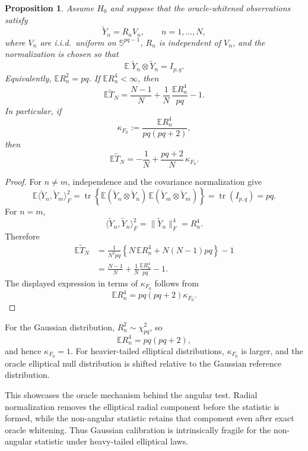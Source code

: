 \documentclass[12pt]{article}
\newtheorem{proposition}{Proposition}
\begin{document}
\begin{proposition}
\label{prop:oracle-elliptical-radial-sensitivity}
Assume \(H_0\) and suppose that the oracle-whitened observations satisfy
\[
        \widetilde Y_n = R_n V_n,
        \qquad n=1,\ldots,N,
\]
where \(V_n\) are i.i.d.~uniform on \(\mathbb S^{pq-1}\), \(R_n\) is independent of \(V_n\), and
the normalization is chosen so that
\[
        \mathbb E\; \widetilde Y_n\otimes \widetilde Y_n = I_{p,q}.
\]
Equivalently, \(\mathbb E R_n^2=pq\). If \(\mathbb E R_n^4<\infty\), then
\[
        \mathbb E \widetilde T_N
        =
        \frac{N-1}{N}
        +
        \frac{1}{N}\,
        \frac{\mathbb E R_n^4}{pq}
        -1 .
\]
In particular, if
\[
        \kappa_{F_0}
        :=
        \frac{\mathbb E R_n^4}{pq(pq+2)},
\]
then
\[
        \mathbb E \widetilde T_N
        =
        -\frac{1}{N}
        +
        \frac{pq+2}{N}\,\kappa_{F_0}.
\]
\end{proposition}

\begin{proof}
For \(n\neq m\), independence and the covariance normalization give
\[
        \mathbb E\langle \widetilde Y_n,\widetilde Y_m\rangle_F^2
        =
        \operatorname{tr}
        \left\{
        \mathbb E(\widetilde Y_n\otimes \widetilde Y_n)
        \,
        \mathbb E(\widetilde Y_m\otimes \widetilde Y_m)
        \right\}
        =
        \operatorname{tr}(I_{p,q})
        =
        pq .
\]
For \(n=m\),
\[
        \langle \widetilde Y_n,\widetilde Y_n\rangle_F^2
        =
        \|\widetilde Y_n\|_F^4
        =
        R_n^4 .
\]
Therefore
\[
\begin{aligned}
        \mathbb E \widetilde T_N
        &=
        \frac{1}{N^2pq}
        \left\{
        N\,\mathbb E R_n^4
        +
        N(N-1)pq
        \right\}
        -1  \\
        &=
        \frac{N-1}{N}
        +
        \frac{1}{N}\frac{\mathbb E R_n^4}{pq}
        -1 .
\end{aligned}
\]
The displayed expression in terms of \(\kappa_{F_0}\) follows from
\[
        \mathbb E R_n^4=pq(pq+2)\kappa_{F_0}.
\]
\end{proof}

For the Gaussian distribution, \(R_n^2\sim\chi^2_{pq}\), so
\[
        \mathbb E R_n^4=pq(pq+2),
\]
and hence \(\kappa_{F_0}=1\). For heavier-tailed elliptical distributions,
\(\kappa_{F_0}\) is larger, and the oracle elliptical null distribution is shifted relative
to the Gaussian reference distribution.

This showcases the oracle mechanism behind the angular test. Radial normalization removes
the elliptical radial component before the statistic is formed, while the non-angular statistic
retains that component even after exact oracle whitening. Thus Gaussian calibration is
intrinsically fragile for the non-angular statistic under heavy-tailed elliptical laws.
\end{document}
